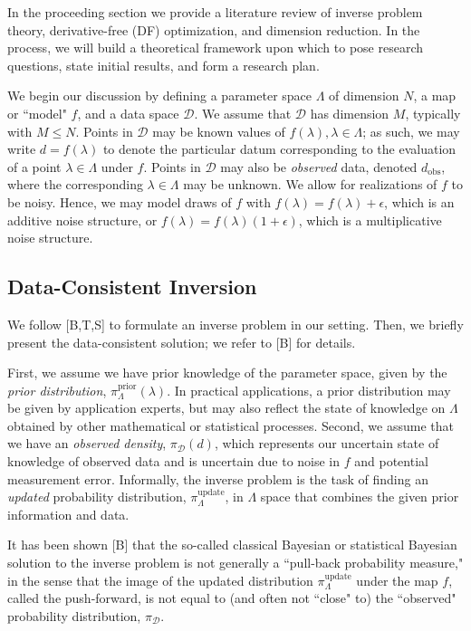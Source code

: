 \documentclass{amsart}
\begin{document}
In the proceeding section we provide a literature review of inverse problem theory, derivative-free (DF) optimization, and dimension reduction. In the process, we will build a theoretical framework upon which to pose research questions, state initial results, and form a research plan. 

We begin our discussion by defining a parameter space $\Lambda$ of dimension $N$, a map or ``model" $f$, and a data space $\mathcal{D}$. We assume that $\mathcal{D}$ has dimension $M$, typically with $M\leq N$. Points in $\mathcal{D}$ may be known values of $f(\lambda), \lambda\in \Lambda$; as such, we may write $d=f(\lambda)$ to denote the particular datum corresponding to the evaluation of a point $\lambda \in \Lambda$ under $f$. Points in $\mathcal{D}$ may also be \textit{observed} data, denoted $d_{\text{obs}}$, where the corresponding $\lambda\in \Lambda$ may be unknown. We allow for realizations of $f$ to be  noisy. Hence, we may model draws of $f$ with $f(\lambda)=f(\lambda)+\epsilon$, which is an additive noise structure, or $f(\lambda)=f(\lambda)(1+\epsilon)$, which is a multiplicative noise structure.


\subsection{Data-Consistent Inversion}


We follow [B,T,S] to formulate an inverse problem in our setting. Then, we briefly present the data-consistent solution; we refer to [B] for details.

First, we assume we have prior knowledge of the parameter space, given by the \emph{prior distribution}, $\pi_\Lambda^\text{prior}(\lambda)$. In practical applications, a prior distribution may be given by application experts, but may also reflect the state of knowledge on $\Lambda$ obtained by other mathematical or statistical processes. Second, we assume that we have an \emph{observed density}, $\pi_\mathcal{D}(d)$, which represents our uncertain state of knowledge of observed data and is uncertain due to noise in $f$ and potential measurement error. Informally, the inverse problem is the task of finding an \emph{updated} probability distribution, $\pi_\Lambda^\text{update}$, in $\Lambda$ space that combines the given prior information and data.

It has been shown [B] that the so-called classical Bayesian or statistical Bayesian solution to the inverse problem is not generally a ``pull-back probability measure," in the sense that the image of the updated distribution $\pi_\Lambda^\text{update}$ under the map $f$, called the push-forward, is not equal to (and often not ``close" to) the ``observed" probability distribution, $\pi_\mathcal{D}$. 
\end{document}
